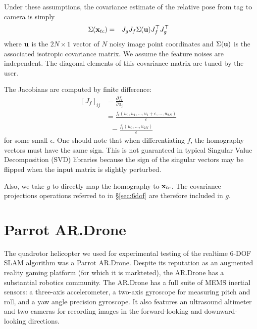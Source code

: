 \documentclass[conference]{IEEEtran}
\begin{document}
Under these assumptions, the covariance estimate of the relative pose from tag to camera
is simply
\begin{eqnarray*}
  \Sigma({{\bf x}_{tc}}) & = & J_g J_f \Sigma({\bf u}) J_f^\top J_g^\top
\end{eqnarray*}
where ${\bf u}$ is the $2N \times 1$ vector of $N$ noisy image point coordinates and
$\Sigma({\bf u})$ is the associated isotropic covariance matrix.  We assume the feature
noises are independent. The diagonal elements of this covariance matrix are tuned by the
user.

The Jacobians are computed by finite difference:
\begin{align*}
  \left[J_f\right]_{ij} &=\frac{\partial f_i}{\partial u_j} \\
  &= \frac{f_i(u_0, u_1, \dots, u_i +
    \epsilon, \dots, u_{2N})}{\epsilon} \\
  & \ \ \  - \frac{f_i(u_0, \dots, u_{2N})}{\epsilon}
\end{align*}
for some small $\epsilon$. One should note that when differentiating $f$, the homography
vectors must have the same sign.  This is not guaranteed in typical Singular Value
Decomposition (SVD) libraries because the sign of the singular vectors may be flipped when
the input matrix is slightly perturbed.

Also, we take $g$ to directly map the homography to ${\bf x}_{tc}$.  The covariance
projections operations referred to in \S\ref{sec:6dof} are therefore included in $g$.


\section{Parrot AR.Drone}
\label{sub:quadrotor}


The quadrotor helicopter we used for experimental testing of the realtime 6-DOF SLAM algorithm
was a Parrot AR.Drone. Despite its reputation as an augmented reality gaming platform (for which
it is markteted), the AR.Drone has a substantial robotics community. The AR.Drone has a full 
suite of MEMS inertial sensors: a three-axis accelerometer, a two-axis gyroscope for measuring 
pitch and roll, and a yaw angle precision gyroscope.  It also features an ultrasound altimeter
and two cameras for recording images in the forward-looking and downward-looking directions.
\end{document}
